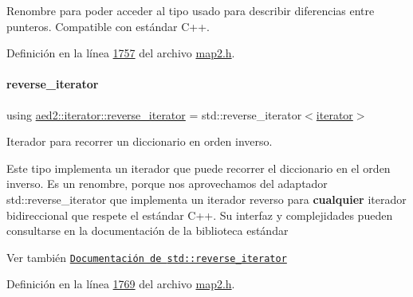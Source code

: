 Renombre para poder acceder al tipo usado para describir diferencias entre punteros. Compatible con estándar C++. 



Definición en la línea \hyperlink{map2_8h_source_l01757}{1757} del archivo \hyperlink{map2_8h_source}{map2.\+h}.

\mbox{\label{classaed2_1_1iterator_a07b2c0fa31611e03cd019b290acd6d80_a07b2c0fa31611e03cd019b290acd6d80}} 
\paragraph{\texorpdfstring{reverse\+\_\+iterator}{reverse\_iterator}}
{\footnotesize\ttfamily using \hyperlink{classaed2_1_1iterator_a07b2c0fa31611e03cd019b290acd6d80_a07b2c0fa31611e03cd019b290acd6d80}{aed2\+::iterator\+::reverse\+\_\+iterator} =  std\+::reverse\+\_\+iterator$<$\hyperlink{classaed2_1_1iterator_1_1iterator}{iterator}$>$}



Iterador para recorrer un diccionario en orden inverso. 

Este tipo implementa un iterador que puede recorrer el diccionario en el orden inverso. Es un renombre, porque nos aprovechamos del adaptador {\ttfamily std\+::reverse\+\_\+iterator} que implementa un iterador reverso para {\bfseries cualquier} iterador bidireccional que respete el estándar C++. Su interfaz y complejidades pueden consultarse en la documentación de la biblioteca estándar

\begin{DoxySeeAlso}{Ver también}
\href{http://en.cppreference.com/w/cpp/iterator/reverse_iterator}{\tt Documentación de {\ttfamily std\+::reverse\+\_\+iterator}} 
\end{DoxySeeAlso}


Definición en la línea \hyperlink{map2_8h_source_l01769}{1769} del archivo \hyperlink{map2_8h_source}{map2.\+h}.

\mbox{\label{classaed2_1_1iterator_a657402896e5b5966660032f5686cc4c4_a657402896e5b5966660032f5686cc4c4}} 
